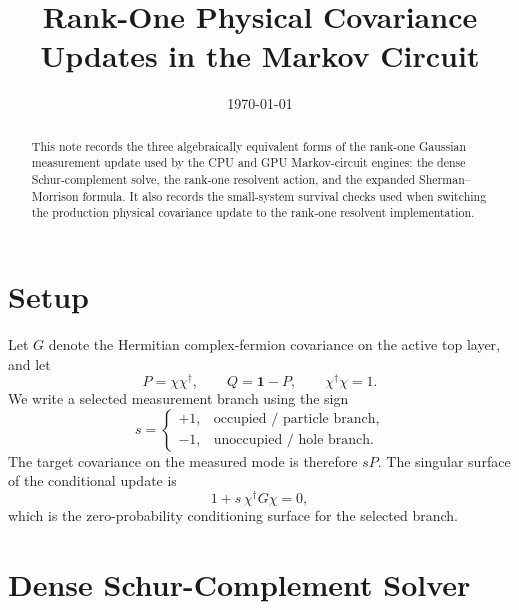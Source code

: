 \documentclass[aps,prb,onecolumn,nofootinbib,superscriptaddress]{revtex4-2}
\newcommand{\Id}{\mathbf{1}}
\begin{document}
\title{Rank-One Physical Covariance Updates in the Markov Circuit}
\author{}
\date{\today}

\begin{abstract}
This note records the three algebraically equivalent forms of the rank-one
Gaussian measurement update used by the CPU and GPU Markov-circuit engines:
the dense Schur-complement solve, the rank-one resolvent action, and the
expanded Sherman--Morrison formula.  It also records the small-system survival
checks used when switching the production physical covariance update to the
rank-one resolvent implementation.
\end{abstract}

\maketitle
\setcounter{tocdepth}{2}
\tableofcontents

\section{Setup}

Let \(G\) denote the Hermitian complex-fermion covariance on the active top
layer, and let
\begin{equation}
    P = \chi \chi^\dagger,\qquad Q=\Id-P,\qquad \chi^\dagger\chi=1.
\end{equation}
We write a selected measurement branch using the sign
\begin{equation}
    s =
    \begin{cases}
        +1, & \text{occupied / particle branch},\\
        -1, & \text{unoccupied / hole branch}.
    \end{cases}
\end{equation}
The target covariance on the measured mode is therefore \(sP\).  The singular
surface of the conditional update is
\begin{equation}
    1+s\,\chi^\dagger G\chi = 0,
\end{equation}
which is the zero-probability conditioning surface for the selected branch.

\section{Dense Schur-Complement Solver}
\end{document}
